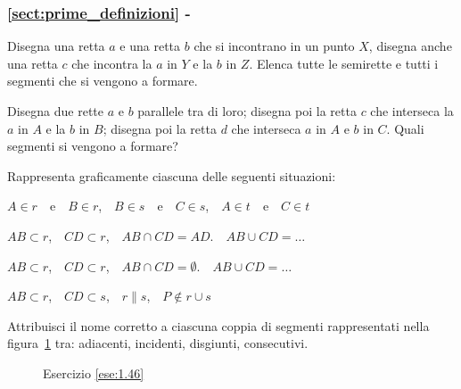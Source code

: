 \begingroup
\hypersetup{linkcolor=black}
\subsubsection*{\ref{sect:prime_definizioni} - 
}
\endgroup

\begin{esercizio}
\label{ese:1.43}
Disegna una retta \(a\) e una retta \(b\) che si incontrano in un punto 
\(X\), disegna anche una retta \(c\) che incontra la \(a\) in \(Y\) e la \(b\) 
in \(Z\). Elenca tutte le semirette e tutti i segmenti che si vengono a 
formare.
\end{esercizio}

\begin{esercizio}
\label{ese:1.44}
Disegna due rette \(a\) e \(b\) parallele tra di loro; disegna poi la 
retta \(c\) che interseca la \(a\) in \(A\) e la \(b\) in \(B\); disegna poi la 
retta \(d\) che interseca \(a\) in \(A\) e \(b\) in \(C\). Quali segmenti si 
vengono a formare?
\end{esercizio}

\begin{esercizio}
\label{ese:1.45}
Rappresenta graficamente ciascuna delle seguenti situazioni:
\begin{enumeratea}
\item \(A\in r\)~~e~~\(B\in r\),~~\(B\in s\)~~e~~\(C\in s\),~~\(A\in 
t\)~~e~~\(C\in t\)
\item \(AB\subset r\),~~\(CD\subset r\),~~\(AB\cap CD=AD\).~~\(AB\cup 
CD=\ldots{}\)
\item \(AB\subset r\),~~\(CD\subset r\),~~\(AB\cap CD=\emptyset\).~~\(AB\cup 
CD=\ldots{}\)
\item \(AB\subset r\),~~\(CD\subset s\),~~\(r\parallel s\),~~\(P\notin r\cup 
s\)
\end{enumeratea}
\end{esercizio}

\begin{esercizio}
\label{ese:1.46}
Attribuisci il nome corretto a ciascuna coppia di segmenti 
rappresentati nella figura~\ref{fig:ese1.46} tra: adiacenti, 
incidenti, disgiunti, consecutivi.
\end{esercizio}


\begin{inaccessibleblock}
 \begin{figure}[htb]
 \centering
 \caption{Esercizio \ref{ese:1.46}}\label{fig:ese1.46}
\end{figure}
\end{inaccessibleblock}

